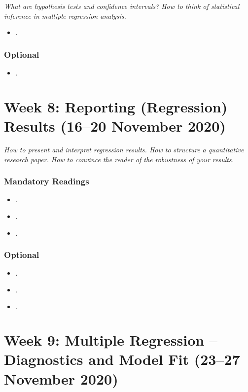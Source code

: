 \documentclass[abstract=on,parskip=full,headings=standardclasses,fontsize=11pt,paper=a4]{scrartcl}
\begin{document}
\textit{What are hypothesis tests and confidence intervals? How to think of statistical inference in multiple regression analysis.}


\begin{itemize}
\item {}.
\end{itemize}


\subsubsection*{Optional}
\begin{itemize}
\item {}.
\end{itemize}


\section{Week 8: Reporting (Regression) Results (16--20 November 2020)}


\textit{How to present and interpret regression results. How to structure a quantitative research paper. How to convince the reader of the robustness of your results.}


\subsubsection*{Mandatory Readings}
\begin{itemize}
\item {}.
\item {}.
\item {}.
\end{itemize}


\subsubsection*{Optional}
\begin{itemize}
\item {}.
\item {}.
\item {}.
\end{itemize}



\section{Week 9: Multiple Regression --  Diagnostics and Model Fit (23--27 November 2020)}
\end{document}
